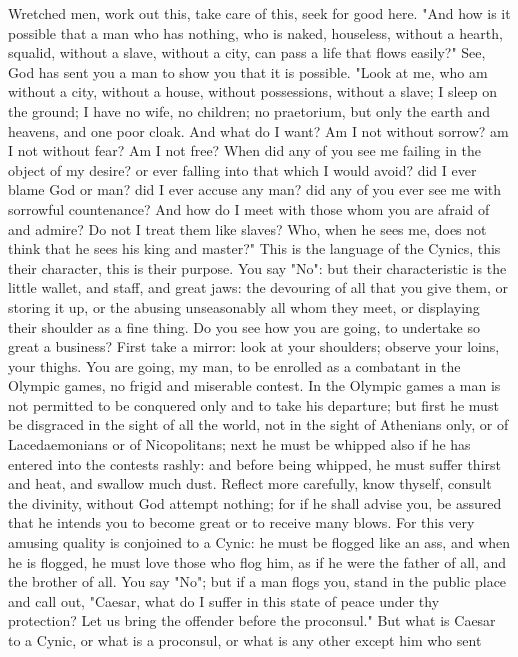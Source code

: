 \documentclass[a4paper]{article}
\begin{document}
Wretched men, work out this, take care of this, seek for good here.
    "And how is it possible that a man who has nothing, who is naked,
houseless, without a hearth, squalid, without a slave, without a city, can pass
a life that flows easily?" See, God has sent you a man to show you that it is
possible. "Look at me, who am without a city, without a house, without
possessions, without a slave; I sleep on the ground; I have no wife, no
children; no praetorium, but only the earth and heavens, and one poor cloak.
And what do I want? Am I not without sorrow? am I not without fear? Am I not
free? When did any of you see me failing in the object of my desire? or ever
falling into that which I would avoid? did I ever blame God or man? did I ever
accuse any man? did any of you ever see me with sorrowful countenance? And how
do I meet with those whom you are afraid of and admire? Do not I treat them
like slaves? Who, when he sees me, does not think that he sees his king and
master?"
    This is the language of the Cynics, this their character, this is their
purpose. You say "No": but their characteristic is the little wallet, and
staff, and great jaws: the devouring of all that you give them, or storing it
up, or the abusing unseasonably all whom they meet, or displaying their
shoulder as a fine thing. Do you see how you are going, to undertake so great a
business? First take a mirror: look at your shoulders; observe your loins, your
thighs. You are going, my man, to be enrolled as a combatant in the Olympic
games, no frigid and miserable contest. In the Olympic games a man is not
permitted to be conquered only and to take his departure; but first he must be
disgraced in the sight of all the world, not in the sight of Athenians only, or
of Lacedaemonians or of Nicopolitans; next he must be whipped also if he has
entered into the contests rashly: and before being whipped, he must suffer
thirst and heat, and swallow much dust.
    Reflect more carefully, know thyself, consult the divinity, without God
attempt nothing; for if he shall advise you, be assured that he intends you to
become great or to receive many blows. For this very amusing quality is
conjoined to a Cynic: he must be flogged like an ass, and when he is flogged,
he must love those who flog him, as if he were the father of all, and the
brother of all. You say "No"; but if a man flogs you, stand in the public place
and call out, "Caesar, what do I suffer in this state of peace under thy
protection? Let us bring the offender before the proconsul." But what is Caesar
to a Cynic, or what is a proconsul, or what is any other except him who sent
\end{document}
